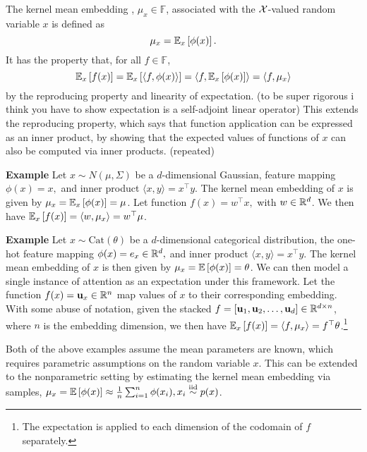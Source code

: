 \documentclass{article}
\begin{document}
The kernel mean embedding \citep{smola2007}, $\mu_x\in\mathbb{F}$,
associated with the $\mathcal{X}$-valued random variable $x$
is defined as
\begin{equation}
\label{eqn:kme}
\mu_x = \mathbb{E}_{x}\left[\phi(x)\right].
\end{equation}
It has the property that, for all $f \in \mathbb{F}$,
\begin{equation}
\label{eqn:expectation-inner-product}
\mathbb{E}_{x}\left[f(x)\right]
= \mathbb{E}_{x}\left[\langle f, \phi(x)\rangle\right]
= \langle f, \mathbb{E}_{x}\left[\phi(x)\right]\rangle
= \langle f, \mu_x \rangle
\end{equation}
by the reproducing property and linearity of expectation.
(to be super rigorous i think you have to show expectation is a self-adjoint linear operator)
This extends the reproducing property,
which says that function application can be expressed as an inner product,
by showing that the expected values of functions of $x$ can also
be computed via inner products. (repeated)

\textbf{Example}
Let $x\sim N(\mu, \Sigma)$ be a $d$-dimensional Gaussian,
feature mapping $\phi(x) = x,$
and inner product $\langle x, y\rangle = x^\top y$.
The kernel mean embedding of $x$ is given by $\mu_x = \mathbb{E}_{x}\left[\phi(x)\right] = \mu$.
Let function $f(x) = w^\top x,$ with $w\in\mathbb{R}^d$.
We then have $\mathbb{E}_{x}\left[f(x)\right] = \langle w, \mu_x \rangle = w^\top \mu$.

\textbf{Example}
Let $x\sim \textrm{Cat}(\theta)$ be a $d$-dimensional categorical distribution,
the one-hot feature mapping $\phi(x) = e_x\in\mathbb{R}^d,$
and inner product $\langle x, y\rangle = x^\top y$.
The kernel mean embedding of $x$ is then given by $\mu_x = \mathbb{E}\left[\phi(x)\right] = \theta$.
We can then model a single instance of attention as an expectation under this framework.
Let the function $f(x) = \mathbf{u}_x\in\mathbb{R}^n$ map values of $x$ to their corresponding embedding.
With some abuse of notation,
given the stacked $f = [\mathbf{u}_1, \mathbf{u}_2, \ldots, \mathbf{u}_d] \in \mathbb{R}^{d\times n}$,
where $n$ is the embedding dimension,
we then have
$\mathbb{E}_{x}\left[f(x)\right] = \langle f, \mu_x\rangle = f^\top\theta$.\footnote{
The expectation is applied to each dimension of the codomain of $f$ separately.
}

Both of the above examples assume the mean parameters are known,
which requires parametric assumptions on the random variable $x$.
This can be extended to the nonparametric setting by estimating the
kernel mean embedding via samples,
$\mu_x = \mathbb{E}\left[\phi(x)\right] \approx \frac{1}{n}\sum_{i=1}^n \phi(x_i), x_i\stackrel{\textrm{iid}}{\sim} p(x)$.
\end{document}

